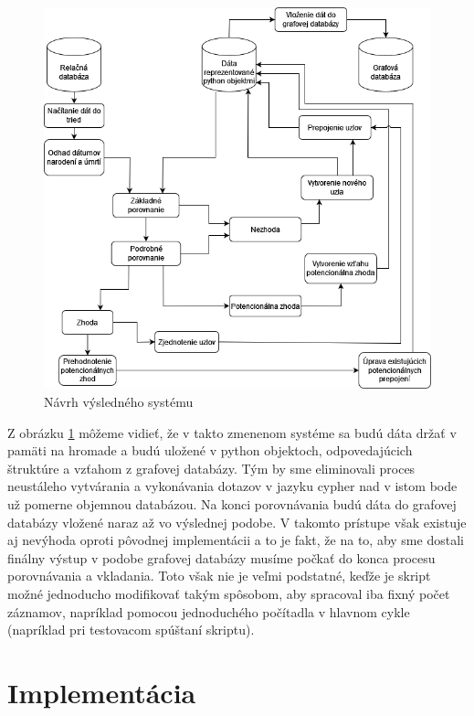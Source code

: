 \begin{figure}[h]
\label{after}
\centering
\includegraphics[width=1\textwidth]{obrazky-figures/Untitled Diagram.drawio.png}
\caption{Návrh výsledného systému}
\end{figure}

Z obrázku \ref{after} môžeme vidieť, že v takto zmenenom systéme sa budú dáta držať v pamäti na hromade a budú uložené v python objektoch, odpovedajúcich štruktúre a vzťahom z grafovej databázy. Tým by sme eliminovali proces neustáleho vytvárania a vykonávania dotazov v jazyku cypher nad v istom bode už pomerne objemnou databázou. Na konci porovnávania budú dáta do grafovej databázy vložené naraz až vo výslednej podobe. V takomto prístupe však existuje aj nevýhoda oproti pôvodnej implementácii a to je fakt, že na to, aby sme dostali finálny výstup v podobe grafovej databázy musíme počkať do konca procesu porovnávania a vkladania. Toto však nie je veľmi podstatné, keďže je skript možné jednoducho modifikovať takým spôsobom, aby spracoval iba fixný počet záznamov, napríklad pomocou jednoduchého počítadla v hlavnom cykle (napríklad pri testovacom spúštaní skriptu).

\chapter{Implementácia}

